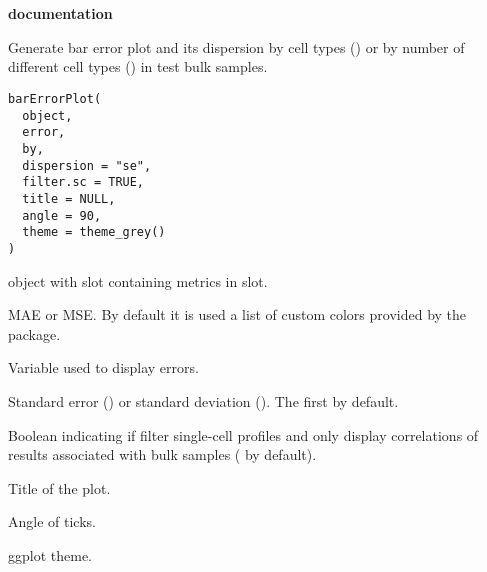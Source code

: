 \documentclass[a4paper]{book}
\begin{document}
\chapter*{}
\begin{center}
{\textbf{\huge \R{} documentation}} \par{}
\par\bigskip{\large \today}
\end{center}
%
\begin{Description}\relax
Generate bar error plot and its dispersion by cell types () or
by number of different cell types () in test bulk samples.
\end{Description}
%
\begin{Usage}
\begin{verbatim}
barErrorPlot(
  object,
  error,
  by,
  dispersion = "se",
  filter.sc = TRUE,
  title = NULL,
  angle = 90,
  theme = theme_grey()
)
\end{verbatim}
\end{Usage}
%
\begin{Arguments}
\begin{ldescription}
\item[\code{object}]  object with  slot
containing metrics in  slot.

\item[\code{error}] MAE or MSE. By default it is used a list of custom colors
provided by the package.

\item[\code{by}] Variable used to display errors.

\item[\code{dispersion}] Standard error () or standard deviation
(). The first by default.

\item[\code{filter.sc}] Boolean indicating if filter single-cell profiles and only
display correlations of results associated with bulk samples (
by default).

\item[\code{title}] Title of the plot.

\item[\code{angle}] Angle of ticks.

\item[\code{theme}] ggplot theme.
\end{ldescription}
\end{Arguments}
\end{document}
